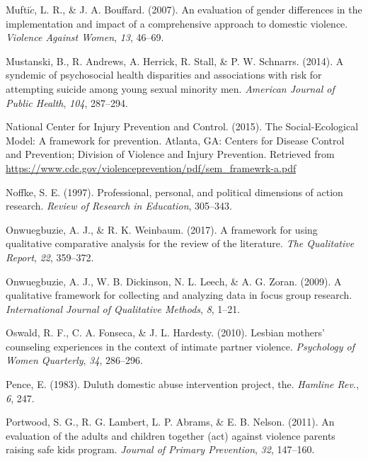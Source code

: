 \documentclass[11pt,]{tufte-book}
\begin{document}
\hypertarget{ref-muftic2007evaluation}{}
Mufti\(\acute{c}\), L. R., \& J. A. Bouffard. (2007). An evaluation of
gender differences in the implementation and impact of a comprehensive
approach to domestic violence. \emph{Violence Against Women}, \emph{13},
46--69.

\hypertarget{ref-mustanski2014syndemic}{}
Mustanski, B., R. Andrews, A. Herrick, R. Stall, \& P. W. Schnarrs.
(2014). A syndemic of psychosocial health disparities and associations
with risk for attempting suicide among young sexual minority men.
\emph{American Journal of Public Health}, \emph{104}, 287--294.

\hypertarget{ref-centers2015social}{}
National Center for Injury Prevention and Control. (2015). The
Social-Ecological Model: A framework for prevention. Atlanta, GA:
Centers for Disease Control and Prevention; Division of Violence and
Injury Prevention. Retrieved from
\url{https://www.cdc.gov/violenceprevention/pdf/sem_framewrk-a.pdf}

\hypertarget{ref-noffke1997professional}{}
Noffke, S. E. (1997). Professional, personal, and political dimensions
of action research. \emph{Review of Research in Education}, 305--343.

\hypertarget{ref-onwuegbuzie2017framework}{}
Onwuegbuzie, A. J., \& R. K. Weinbaum. (2017). A framework for using
qualitative comparative analysis for the review of the literature.
\emph{The Qualitative Report}, \emph{22}, 359--372.

\hypertarget{ref-onwuegbuzie2009qualitative}{}
Onwuegbuzie, A. J., W. B. Dickinson, N. L. Leech, \& A. G. Zoran.
(2009). A qualitative framework for collecting and analyzing data in
focus group research. \emph{International Journal of Qualitative
Methods}, \emph{8}, 1--21.

\hypertarget{ref-oswald2010lesbian}{}
Oswald, R. F., C. A. Fonseca, \& J. L. Hardesty. (2010). Lesbian
mothers' counseling experiences in the context of intimate partner
violence. \emph{Psychology of Women Quarterly}, \emph{34}, 286--296.

\hypertarget{ref-pence1983duluth}{}
Pence, E. (1983). Duluth domestic abuse intervention project, the.
\emph{Hamline Rev.}, \emph{6}, 247.

\hypertarget{ref-portwood2011evaluation}{}
Portwood, S. G., R. G. Lambert, L. P. Abrams, \& E. B. Nelson. (2011).
An evaluation of the adults and children together (act) against violence
parents raising safe kids program. \emph{Journal of Primary Prevention},
\emph{32}, 147--160.
\end{document}
